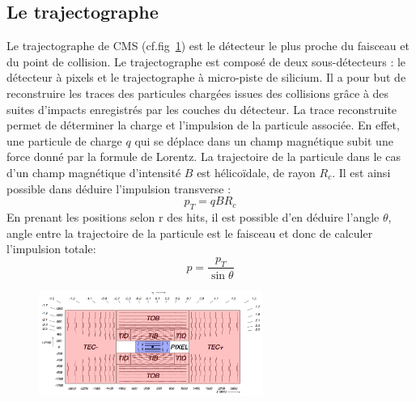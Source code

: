 \subsection{Le trajectographe}
Le trajectographe de CMS (cf.fig~\ref{trajectographe}) est le détecteur le plus proche du faisceau et du point de collision. Le trajectographe est composé de deux sous-détecteurs : le détecteur à pixels et le trajectographe à micro-piste de silicium. Il a pour but de reconstruire les traces des particules chargées issues des collisions grâce à des suites d'impacts enregistrés par les couches du détecteur. La trace reconstruite permet de déterminer la charge et l'impulsion de la particule associée. En effet, une particule de charge $q$ qui se déplace dans un champ magnétique subit une force donné par la formule de Lorentz. La trajectoire de la particule dans le cas d'un champ magnétique d'intensité $B$ est hélicoïdale, de rayon $R_{c}$. Il est ainsi possible dans déduire l'impulsion transverse :
\begin{equation}
p_{T}=qBR_{c}
\end{equation}
En prenant les positions selon r des hits, il est possible d'en déduire l'angle $\theta$, angle entre la trajectoire de la particule est le faisceau et donc de calculer l'impulsion totale:
\begin{equation}
p=\frac{p_{T}}{\sin\theta}
\end{equation}
\begin{figure}[ht!]
	\centering
	\includegraphics[width=0.65\textwidth]{CMS/tracker.png}
	\label{trajectographe}
\end{figure}

